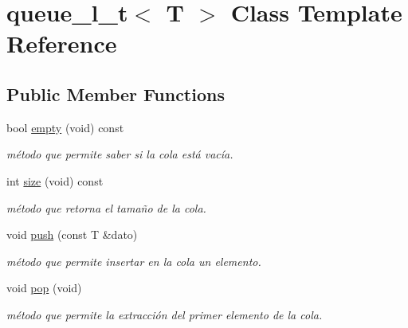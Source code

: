 \hypertarget{classqueue__l__t}{}\section{queue\+\_\+l\+\_\+t$<$ T $>$ Class Template Reference}
\label{classqueue__l__t}
\subsection*{Public Member Functions}
\begin{DoxyCompactItemize}
\item 
\mbox{\label{classqueue__l__t_ac959c0465eff8b2591a42bc8b0046f6e}} 
bool \hyperlink{classqueue__l__t_ac959c0465eff8b2591a42bc8b0046f6e}{empty} (void) const
\begin{DoxyCompactList}\small\item\em método que permite saber si la cola está vacía. \end{DoxyCompactList}\item 
\mbox{\label{classqueue__l__t_a81f448215d8ffd439aab985dcbc403a5}} 
int \hyperlink{classqueue__l__t_a81f448215d8ffd439aab985dcbc403a5}{size} (void) const
\begin{DoxyCompactList}\small\item\em método que retorna el tamaño de la cola. \end{DoxyCompactList}\item 
\mbox{\label{classqueue__l__t_ae31c874c491a1ccf48e05444a7a5627d}} 
void \hyperlink{classqueue__l__t_ae31c874c491a1ccf48e05444a7a5627d}{push} (const T \&dato)
\begin{DoxyCompactList}\small\item\em método que permite insertar en la cola un elemento. \end{DoxyCompactList}\item 
\mbox{\label{classqueue__l__t_a8063a7ee52f7dd0d3eb7717f2d93a13e}} 
void \hyperlink{classqueue__l__t_a8063a7ee52f7dd0d3eb7717f2d93a13e}{pop} (void)
\begin{DoxyCompactList}\small\item\em método que permite la extracción del primer elemento de la cola. \end{DoxyCompactList}\item 

\end{DoxyCompactItemize}
